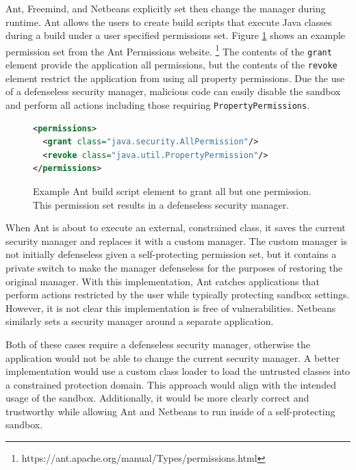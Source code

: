 \documentclass{sig-alternate}
\begin{document}
Ant, Freemind, and Netbeans explicitly set then change the manager
during runtime. Ant allows the users to create build scripts that
execute Java classes during a build under a user specified
permissions set. Figure \ref{fig:Ant Permissions Example}
shows an example permission set from the Ant Permissions website.%
\footnote{https://ant.apache.org/manual/Types/permissions.html%
} The contents of the \texttt{grant} element provide the application
all permissions, but the contents of the \texttt{revoke} element restrict
the application from using all property permissions. Due the use of a
defenseless security manager, malicious code can easily disable the sandbox and perform all actions
including those requiring \texttt{PropertyPermissions}.

\begin{figure}
\begin{lstlisting}[language=XML,basicstyle={\scriptsize}]
<permissions>   
  <grant class="java.security.AllPermission"/>   
  <revoke class="java.util.PropertyPermission"/> 
</permissions>
\end{lstlisting}

\caption{Example Ant build script element to grant all but one permission.
This permission set results in a defenseless security manager.}
\label{fig:Ant Permissions Example}
\end{figure}

When Ant is about to execute an external, constrained class, it saves the current security manager and replaces it with a custom manager. The custom manager is not initially defenseless given a self-protecting permission set, but it contains a private switch to make the manager defenseless for the purposes of restoring the original manager. With this implementation, Ant catches applications that perform actions
restricted by the user while typically protecting sandbox settings. However, it is not clear this implementation
is free of vulnerabilities. Netbeans similarly sets a security manager around a separate application.

Both of these cases require a defenseless security manager, otherwise
the application would not be able to change the current security manager.
A better implementation would use a custom class
loader to load the untrusted classes into a constrained protection
domain. This approach would align with the intended usage of the sandbox.
Additionally, it would be more clearly correct and trustworthy while
allowing Ant and Netbeans to run inside of a self-protecting sandbox.
\end{document}
